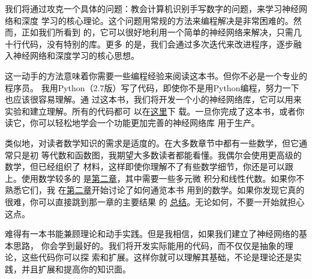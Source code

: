 我们将通过攻克一个具体的问题：教会计算机识别手写数字的问题，来学习神经网络和深度
学习的核心理论。这个问题用常规的方法来编程解决是非常困难的。然而，正如我们所看到
的，它可以很好地利用一个简单的神经网络来解决，只需几十行代码，没有特别的库。更多
的是，我们会通过多次迭代来改进程序，逐步融入神经网络和深度学习的核心思想。

这一动手的方法意味着你需要一些编程经验来阅读这本书。但你不必是一个专业的程序员。
我用Python（2.7版）写了代码，即使你不是用Python编程，努力一下也应该很容易理解。通
过这本书，我们将开发一个小的神经网络库，它可以用来实验和建立理解。所有的代码都可
以在\href{https://github.com/mnielsen/neural-networks-and-deep-learning}{这里}下
载。一旦你完成了这本书，或者你读它，你可以轻松地学会一个功能更加完善的神经网络库
用于生产。

类似地，对读者数学知识的需求是适度的。在大多数章节中都有一些数学，但它通常只是初
等代数和函数图，我期望大多数读者都能看懂。我偶尔会使用更高级的数学，但已经组织了
材料，这样即使你理解不了有些数学细节，你还是可以跟上。使用数学较多的
是\hyperref[ch:HowTheBackpropagationAlgorithmWorks]{第二章}，其中需要一些多元微
积分和线性代数。如果你不熟悉它们，我
在\hyperref[ch:HowTheBackpropagationAlgorithmWorks]{第二章}开始讨论了如何通览本书
用到的数学。如果你发现它真的很难，你可以直接跳到那一章的主要结果
的%
\href{http://neuralnetworksanddeeplearning.com/chap2.html#the_backpropagation_algorithm}{
  总结}。无论如何，不要一开始就担心这点。

难得有一本书能兼顾理论和动手实践。但是我相信，如果我们建立了神经网络的基本思路，
你会学到最好的。我们将开发实际能用的代码，而不仅仅是抽象的理论，这些代码你可以探
索和扩展。这样你就可以理解其基础，不论是理论还是实践，并且扩展和提高你的知识面。
